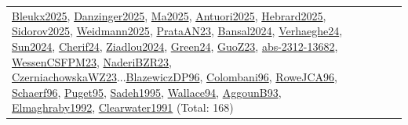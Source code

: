 {\begin{longtable}{p{3cm}r>{\raggedright\arraybackslash}p{6cm}>{\raggedright\arraybackslash}p{6cm}>{\raggedright\arraybackslash}p{8cm}}
\hyperref[detail:Bleukx2025]{Bleukx2025}, \hyperref[detail:Danzinger2025]{Danzinger2025}, \hyperref[detail:Ma2025]{Ma2025}, \hyperref[detail:Antuori2025]{Antuori2025}, \hyperref[detail:Hebrard2025]{Hebrard2025}, \hyperref[detail:Sidorov2025]{Sidorov2025}, \hyperref[detail:Weidmann2025]{Weidmann2025}, \hyperref[detail:PrataAN23]{PrataAN23}, \hyperref[detail:Bansal2024]{Bansal2024}, \hyperref[detail:Verhaeghe24]{Verhaeghe24}, \hyperref[detail:Sun2024]{Sun2024}, \hyperref[detail:Cherif24]{Cherif24}, \hyperref[detail:Ziadlou2024]{Ziadlou2024}, \hyperref[detail:Green24]{Green24}, \hyperref[detail:GuoZ23]{GuoZ23}, \hyperref[detail:abs-2312-13682]{abs-2312-13682}, \hyperref[detail:WessenCSFPM23]{WessenCSFPM23}, \hyperref[detail:NaderiBZR23]{NaderiBZR23}, \hyperref[detail:CzerniachowskaWZ23]{CzerniachowskaWZ23}...\hyperref[detail:BlazewiczDP96]{BlazewiczDP96}, \hyperref[detail:Colombani96]{Colombani96}, \hyperref[detail:RoweJCA96]{RoweJCA96}, \hyperref[detail:Schaerf96]{Schaerf96}, \hyperref[detail:Puget95]{Puget95}, \hyperref[detail:Sadeh1995]{Sadeh1995}, \hyperref[detail:Wallace94]{Wallace94}, \hyperref[detail:AggounB93]{AggounB93}, \hyperref[detail:Elmaghraby1992]{Elmaghraby1992}, \hyperref[detail:Clearwater1991]{Clearwater1991} (Total: 168)\\

\end{longtable}}
